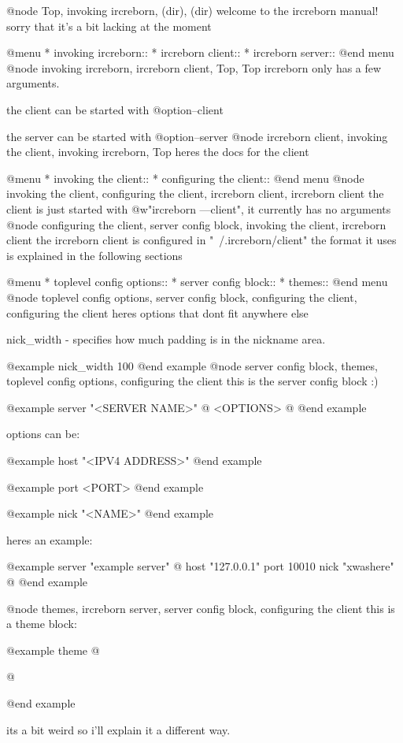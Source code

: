 
@node Top, invoking ircreborn, (dir), (dir)
welcome to the ircreborn manual! sorry that it's a bit lacking at the moment

@menu
* invoking ircreborn::
* ircreborn client::
* ircreborn server::
@end menu
@node invoking ircreborn, ircreborn client, Top, Top
ircreborn only has a few arguments.

the client can be started with @option{--client}

the server can be started with @option{--server}
@node ircreborn client, invoking the client, invoking ircreborn, Top
heres the docs for the client

@menu
* invoking the client::
* configuring the client::
@end menu
@node invoking the client, configuring the client, ircreborn client, ircreborn client
the client is just started with @w{"ircreborn ---client"}, it currently has no arguments
@node configuring the client, server config block, invoking the client, ircreborn client
the ircreborn client is configured in "~/.ircreborn/client"
the format it uses is explained in the following sections

@menu
* toplevel config options::
* server config block::
* themes::
@end menu
@node toplevel config options, server config block, configuring the client, configuring the client
heres options that dont fit anywhere else

nick_width - specifies how much padding is in the nickname area.

@example
nick_width 100
@end example
@node server config block, themes, toplevel config options, configuring the client
this is the server config block :)

@example
server "<SERVER NAME>" @{
    <OPTIONS>
@}
@end example

options can be:

@example
host "<IPV4 ADDRESS>"
@end example

@example
port <PORT>
@end example

@example
nick "<NAME>"
@end example

heres an example:

@example
server "example server" @{
    host "127.0.0.1"
    port 10010
    nick "xwashere"
@}
@end example

@node themes, ircreborn server, server config block, configuring the client
this is a theme block:

@example
theme @{

@}
@end example

its a bit weird so i'll explain it a different way.

